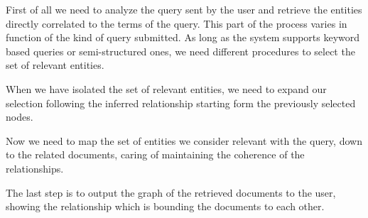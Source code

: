 \documentclass{acm_proc_article-sp-sigmod07}
\begin{document}
First of all we need to analyze the query sent by the user and retrieve
the entities directly correlated to the terms of the query.
This part of the process varies in function of the kind of query
submitted. As long as the system supports keyword based queries or
semi-structured ones, we need different procedures to select the set of
relevant entities.

When we have isolated the set of relevant entities, we need to expand our
selection following the inferred relationship starting form the previously
selected nodes.

Now we need to map the set of entities we consider relevant with the
query, down to the related documents, caring of maintaining the coherence
of the relationships.

The last step is to output the graph of the retrieved documents to the
user, showing the relationship which is bounding the documents to each
other.
\end{document}

